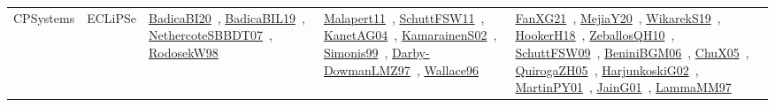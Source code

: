 {\begin{longtable}{lp{3cm}>{\raggedright\arraybackslash}p{6cm}>{\raggedright\arraybackslash}p{6cm}>{\raggedright\arraybackslash}p{8cm}}
CPSystems & ECLiPSe & \href{works/BadicaBI20.pdf}{BadicaBI20}~\cite{BadicaBI20}, \href{works/BadicaBIL19.pdf}{BadicaBIL19}~\cite{BadicaBIL19}, \href{works/NethercoteSBBDT07.pdf}{NethercoteSBBDT07}~\cite{NethercoteSBBDT07}, \href{works/RodosekW98.pdf}{RodosekW98}~\cite{RodosekW98} & \href{works/Malapert11.pdf}{Malapert11}~\cite{Malapert11}, \href{works/SchuttFSW11.pdf}{SchuttFSW11}~\cite{SchuttFSW11}, \href{works/KanetAG04.pdf}{KanetAG04}~\cite{KanetAG04}, \href{works/KamarainenS02.pdf}{KamarainenS02}~\cite{KamarainenS02}, \href{works/Simonis99.pdf}{Simonis99}~\cite{Simonis99}, \href{works/Darby-DowmanLMZ97.pdf}{Darby-DowmanLMZ97}~\cite{Darby-DowmanLMZ97}, \href{works/Wallace96.pdf}{Wallace96}~\cite{Wallace96} & \href{works/FanXG21.pdf}{FanXG21}~\cite{FanXG21}, \href{works/MejiaY20.pdf}{MejiaY20}~\cite{MejiaY20}, \href{works/WikarekS19.pdf}{WikarekS19}~\cite{WikarekS19}, \href{works/HookerH18.pdf}{HookerH18}~\cite{HookerH18}, \href{works/ZeballosQH10.pdf}{ZeballosQH10}~\cite{ZeballosQH10}, \href{works/SchuttFSW09.pdf}{SchuttFSW09}~\cite{SchuttFSW09}, \href{works/BeniniBGM06.pdf}{BeniniBGM06}~\cite{BeniniBGM06}, \href{works/ChuX05.pdf}{ChuX05}~\cite{ChuX05}, \href{works/QuirogaZH05.pdf}{QuirogaZH05}~\cite{QuirogaZH05}, \href{works/HarjunkoskiG02.pdf}{HarjunkoskiG02}~\cite{HarjunkoskiG02}, \href{works/MartinPY01.pdf}{MartinPY01}~\cite{MartinPY01}, \href{works/JainG01.pdf}{JainG01}~\cite{JainG01}, \href{works/LammaMM97.pdf}{LammaMM97}~\cite{LammaMM97}\\

\end{longtable}}

